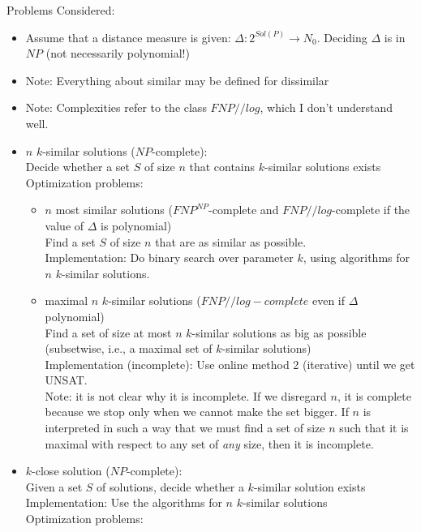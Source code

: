\flushleft
Problems Considered:
\begin{itemize}
\item 
    Assume that a distance measure is given: $\Delta : 2^{Sol(P)} \rightarrow N_0$. 
    Deciding $\Delta$ is in $NP$ (not necessarily polynomial!)
\item
    Note: Everything about similar may be defined for dissimilar
\item
    Note: Complexities refer to the class $FNP//log$, which I don't understand well.
\item
    $n$ $k$-similar solutions ($NP$-complete):\\
    Decide whether a set $S$ of size $n$ that contains $k$-similar solutions exists
    \\Optimization problems:
    \begin{itemize}
    \item
        $n$ most similar solutions ($FNP^{NP}$-complete and $FNP//log$-complete if the value of $\Delta$ is polynomial) \\ 
        Find a set $S$ of size $n$ that are as similar as possible.\\
        Implementation: 
        Do binary search over parameter $k$, using algorithms for $n$ $k$-similar solutions.
    \item
        maximal $n$ $k$-similar solutions ($FNP//log-complete$ even if $\Delta$ polynomial) \\
        Find a set of size at most $n$ $k$-similar solutions as big as possible 
        (subsetwise, i.e., a maximal set of $k$-similar solutions)\\
        Implementation (incomplete):
        Use online method 2 (iterative) until we get UNSAT.
        \\
        Note: it is not clear why it is incomplete. If we disregard $n$, it is complete
        because we stop only when we cannot make the set bigger. 
        If $n$ is interpreted in such a way that we must find a set of size $n$ such 
        that it is maximal with respect to any set of \emph{any} size, 
        then it is incomplete.
    \end{itemize}
\item
    $k$-close solution ($NP$-complete):\\
    Given a set $S$ of solutions, decide whether a $k$-similar solution exists
    \\
    Implementation: Use the algorithms for $n$ $k$-similar solutions
    \\Optimization problems:

\end{itemize}
